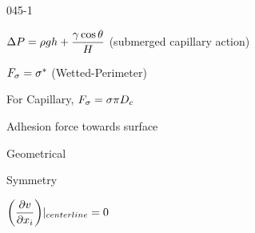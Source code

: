 \begin{mitframe}{045-1}
\begin{listone}
\begin{listtwo}
\begin{listfour}
                                       \item $\iipf\p=\dens\grav\heattranscoeff+\dfrac{\gamma\cos\theta}{\magfield}$ (submerged capillary action)                                     
                                       \item $\force_{\molecrad}=\molecrad^*$ (Wetted-Perimeter)
                                       \begin{listfive}
                                       			\item For Capillary, $\force_{\molecrad}=\molecrad\pi\elecdisplace_{c}$
                                                \item Adhesion force towards surface
                                       \end{listfive}
                            \end{listfour}
                 \item Geometrical
				\begin{listthree}
        		\item Symmetry
               			\begin{listfour}
                    	\item $\bigg(\dfrac{\partial\vvel}{\partial\specfrac{i}}\bigg)|_{centerline}=0$
                        		\end{listfour}
                    \end{listthree}
             \end{listtwo}
\end{listone}

\end{mitframe}